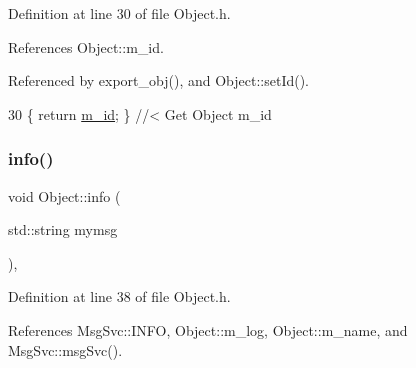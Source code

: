 Definition at line 30 of file Object.\+h.



References Object\+::m\+\_\+id.



Referenced by export\+\_\+obj(), and Object\+::set\+Id().


\begin{DoxyCode}
30 \{ \textcolor{keywordflow}{return} \hyperlink{classObject_aca74b9dbfed7b5556ea2d56c65b6b6b0}{m\_id};         \} \textcolor{comment}{//< Get Object m\_id }
\end{DoxyCode}
\mbox{\label{classObject_a644fd329ea4cb85f54fa6846484b84a8}} 
\subsubsection{\texorpdfstring{info()}{info()}\hspace{0.1cm}{\footnotesize\ttfamily [1/2]}}
{\footnotesize\ttfamily void Object\+::info (\begin{DoxyParamCaption}\item[{std\+::string}]{mymsg }\end{DoxyParamCaption})\hspace{0.3cm}{\ttfamily [inline]}, {\ttfamily [inherited]}}



Definition at line 38 of file Object.\+h.



References Msg\+Svc\+::\+I\+N\+FO, Object\+::m\+\_\+log, Object\+::m\+\_\+name, and Msg\+Svc\+::msg\+Svc().




